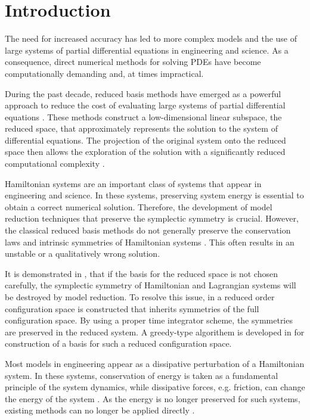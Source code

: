 \section{Introduction} \label{sec:1}

The need for increased accuracy has led to more complex models and the use of large systems of partial differential equations in engineering and science. As a consequence, direct numerical methods for solving PDEs have become computationally demanding and, at times impractical.

During the past decade, reduced basis methods have emerged as a powerful approach to reduce the cost of evaluating large systems of partial differential equations \cite{Ito:1998up,Ito:1998ch,Ito:2001ev}. These methods construct a low-dimensional linear subspace, the reduced space, that approximately represents the solution to the system of differential equations. The projection of the original system onto the reduced space then allows the exploration of the solution with a significantly reduced computational complexity \cite{hesthaven2015certified,quarteroni2015reduced}.

Hamiltonian systems are an important class of systems that appear in engineering and science. In these systems, preserving system energy is essential to obtain a correct numerical solution. Therefore, the development of model reduction techniques that preserve the symplectic symmetry is crucial. However, the classical reduced basis methods do not generally preserve the conservation laws and intrinsic symmetries of Hamiltonian systems \cite{Amsallem:2014ef,prajna2003pod}. This often results in an unstable or a qualitatively wrong solution. 

It is demonstrated in \cite{Maboudi:2016,Lall:2003iy,Carlberg:2014ky,Peng:2014di}, that if the basis for the reduced space is not chosen carefully, the symplectic symmetry of Hamiltonian and Lagrangian systems will be destroyed by model reduction. To resolve this issue, in \cite{Maboudi:2016,Peng:2014di,Lall:2003iy} a reduced order configuration space is constructed that inherits symmetries of the full configuration space. By using a proper time integrator scheme, the symmetries are preserved in the reduced system. A greedy-type algorithem is developed in \cite{Maboudi:2016} for construction of a basis for such a reduced configuration space.

Most models in engineering appear as a dissipative perturbation of a Hamiltonian system. In these systems, conservation of energy is taken as a fundamental principle of the system dynamics, while dissipative forces, e.g. friction, can change the energy of the system \cite{vanderSchaft:2014:PST:2693645.2693646}. As the energy is no longer preserved for such systems, existing methods can no longer be applied directly \cite{peng2016geometric}.

